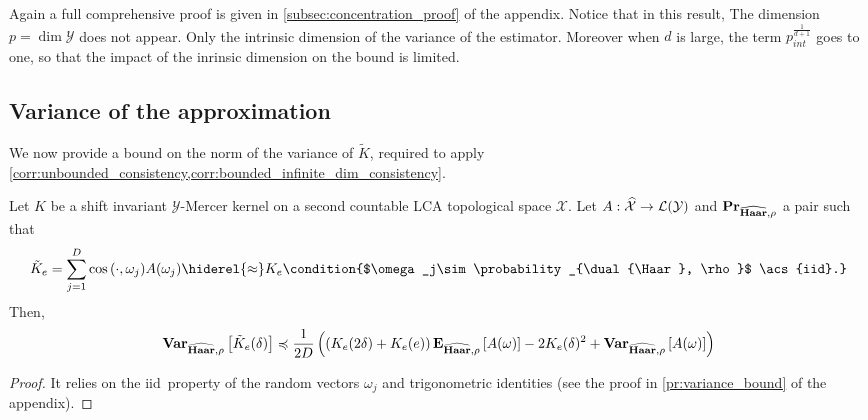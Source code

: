 Again a full comprehensive proof is given in \cref{subsec:concentration_proof}
of the appendix. Notice that in this result, The dimension
$p=\dim{\mathcal{Y}}$ does not appear. Only the intrinsic dimension of the
variance of the estimator. Moreover when $d$ is large, the term
$p_{int}^{\frac{1}{d + 1}}$ goes to one, so that the impact of the inrinsic
dimension on the bound is limited.

\subsection{Variance of the  approximation}
We now provide a bound on the norm of the variance of $\tilde{K}$, required to
apply \cref{corr:unbounded_consistency,corr:bounded_infinite_dim_consistency}.
\begin{proposition}
    Let $K$ be a shift invariant $\mathcal{Y}$-Mercer
    kernel on a second countable \ac{LCA} topological space $\mathcal{X}$. Let
    $A:\widehat{\mathcal{X}}\to\mathcal{L}(\mathcal{Y})$ and
    ${\mathbf{{Pr}}}_{\widehat{\mathbf{Haar}},\rho}$ a pair such that
    \begin{dmath*}
        \tilde{K}_e = \sum_{j=1}^D \cos{\pairing{\cdot,\omega_j}}A (\omega_j)
        \hiderel{\approx}
        K_e\condition{$\omega_j\sim\probability_{\dual{\Haar}, \rho}$
        \acs{iid}.}
    \end{dmath*}
    Then,
    \begin{dmath*}
        \variance_{\dual{\Haar}, \rho} \left[ \tilde{K}_e(\delta) \right]
        \preccurlyeq \frac{1}{2D} \left( \left( K_e(2\delta) + K_e(e) \right)
        \expectation_{\dual{\Haar}, \rho}\left[ A(\omega) \right] -
        2 K_e(\delta)^2 + \variance_{\dual{\Haar}, \rho}\left[
        A(\omega) \right]\right)
    \end{dmath*}
\end{proposition}
\begin{proof}
    It relies on the \ac{iid}~property of the random vectors $\omega_j$ and
    trigonometric identities (see the proof in \cref{pr:variance_bound} of the
    appendix).
\end{proof}

